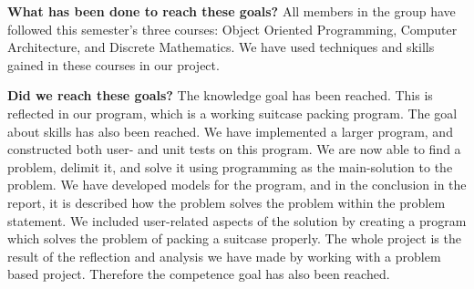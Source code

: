 \textbf{What has been done to reach these goals?} \newline
All members in the group have followed this semester's three courses: Object Oriented Programming, Computer Architecture, and Discrete Mathematics. We have used techniques and skills gained in these courses in our project.

\textbf{Did we reach these goals?} \newline
	The knowledge goal has been reached. This is reflected in our program, which is a working suitcase packing program. The goal about skills has also been reached. We have implemented a larger program, and constructed both user- and unit tests on this program. We are now able to find a problem, delimit it, and solve it using programming as the main-solution to the problem. We have developed models for the program, and in the conclusion in the report, it is described how the problem solves the problem within the problem statement. We included user-related aspects of the solution by creating a program which solves the problem of packing a suitcase properly. The whole project is the result of the reflection and analysis we have made by working with a problem based project. Therefore the competence goal has also been reached. 